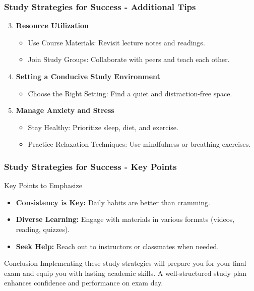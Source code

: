 \documentclass[aspectratio=169]{beamer}
\begin{document}
\begin{frame}[fragile]
    \frametitle{Study Strategies for Success - Additional Tips}
    \begin{enumerate}
        \setcounter{enumi}{2} %
        \item \textbf{Resource Utilization}
            \begin{itemize}
                \item Use Course Materials: Revisit lecture notes and readings.
                \item Join Study Groups: Collaborate with peers and teach each other.
            \end{itemize}
        
        \item \textbf{Setting a Conducive Study Environment}
            \begin{itemize}
                \item Choose the Right Setting: Find a quiet and distraction-free space.
            \end{itemize}
        
        \item \textbf{Manage Anxiety and Stress}
            \begin{itemize}
                \item Stay Healthy: Prioritize sleep, diet, and exercise.
                \item Practice Relaxation Techniques: Use mindfulness or breathing exercises.
            \end{itemize}
    \end{enumerate}
\end{frame}

\begin{frame}[fragile]
    \frametitle{Study Strategies for Success - Key Points}
    \begin{block}{Key Points to Emphasize}
        \begin{itemize}
            \item \textbf{Consistency is Key:} Daily habits are better than cramming.
            \item \textbf{Diverse Learning:} Engage with materials in various formats (videos, reading, quizzes).
            \item \textbf{Seek Help:} Reach out to instructors or classmates when needed.
        \end{itemize}
    \end{block}

    \begin{block}{Conclusion}
        Implementing these study strategies will prepare you for your final exam and equip you with lasting academic skills. A well-structured study plan enhances confidence and performance on exam day.
    \end{block}
\end{frame}
\end{document}
